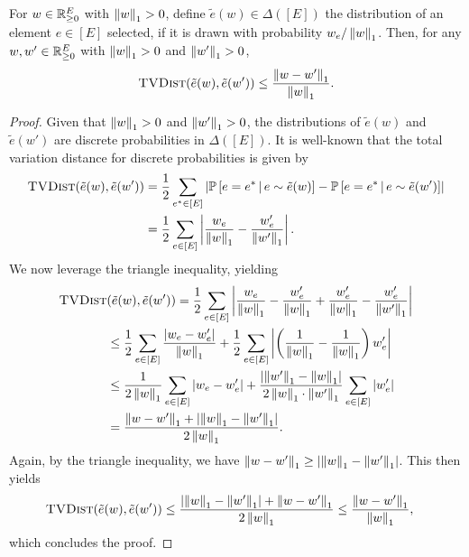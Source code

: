 \begin{lemma}
    \label{lemma:one-sample}
    For $w \in \mathbb R_{\geq 0}^E$ with $\left\lVert{w}\right\rVert_{1} > 0$,
    define $\tilde e(w) \in \Delta([E])$ the distribution of an element $e \in [E]$ selected,
    if it is drawn with probability $w_e / \left\lVert{w}\right\rVert_{1}$.
    Then, for any $w, w' \in \mathbb R_{\geq 0}^E$ with $\left\lVert{w}\right\rVert_{1} > 0$ and $\left\lVert{w'}\right\rVert_{1} > 0$,
    \begin{align}
        \textsc{TVDist}(\tilde e(w), \tilde e(w')) \leq \frac{\left\lVert{w - w'}\right\rVert_{1}}{\left\lVert{w}\right\rVert_{1}}.
    \end{align}
\end{lemma}

\begin{proof}
    Given that $\left\lVert{w}\right\rVert_{1} > 0$ and $\left\lVert{w'}\right\rVert_{1} > 0$,
    the distributions of $\tilde e(w)$ and $\tilde e(w')$ 
    are discrete probabilities in $\Delta([E])$.
    It is well-known that the total variation distance for discrete probabilities is given by
    \begin{align}
        \textsc{TVDist} (\tilde e(w), \tilde e(w'))
        &= \frac{1}{2} \sum_{e^* \in [E]} \left\lvert{
            \mathbb P\left[e = e^* \,\middle|\,e \sim \tilde e(w)\right]
            - \mathbb P\left[e = e^* \,\middle|\,e \sim \tilde e(w')\right]
        }\right\rvert \\
        &= \frac{1}{2} \sum_{e \in [E]} \left\lvert{
            \frac{w_e}{\left\lVert{w}\right\rVert_{1}}
            - \frac{w_e'}{\left\lVert{w'}\right\rVert_{1}}
        }\right\rvert.
    \end{align}
    We now leverage the triangle inequality, yielding
    \begin{align}
        \textsc{TVDist} &(\tilde e(w), \tilde e(w'))
        = \frac{1}{2} \sum_{e \in [E]} \left\lvert{
            \frac{w_e}{\left\lVert{w}\right\rVert_{1}} - \frac{w_e'}{\left\lVert{w}\right\rVert_{1}}
            + \frac{w_e'}{\left\lVert{w}\right\rVert_{1}} - \frac{w_e'}{\left\lVert{w'}\right\rVert_{1}}
        }\right\rvert \\
        &\leq \frac{1}{2} \sum_{e \in [E]} \frac{\left\lvert{w_e - w_e'}\right\rvert}{\left\lVert{w}\right\rVert_{1}}
        + \frac{1}{2} \sum_{e \in [E]} \left\lvert{
            \left( \frac{1}{\left\lVert{w}\right\rVert_{1}} - \frac{1}{\left\lVert{w}\right\rVert_{1}}\right) 
            w_e'
        }\right\rvert \\
        &\leq \frac{1}{2 \left\lVert{w}\right\rVert_{1}} \sum_{e \in [E]} \left\lvert{w_e - w_e'}\right\rvert
        + \frac{\left\lvert{\left\lVert{w'}\right\rVert_{1} - \left\lVert{w}\right\rVert_{1}}\right\rvert}{2 \left\lVert{w}\right\rVert_{1} \cdot \left\lVert{w'}\right\rVert_{1}} 
            \sum_{e \in [E]} \left\lvert{w_e'}\right\rvert \\
        &= \frac{\left\lVert{w - w'}\right\rVert_{1} + \left\lvert{\left\lVert{w}\right\rVert_{1} - \left\lVert{w'}\right\rVert_{1}}\right\rvert}{2 \left\lVert{w}\right\rVert_{1}}.
    \end{align}
    Again, by the triangle inequality, 
    we have $\left\lVert{w - w'}\right\rVert_{1} \geq \left\lvert{\left\lVert{w}\right\rVert_{1} - \left\lVert{w'}\right\rVert_{1}}\right\rvert$.
    This then yields
    \begin{align}
        \textsc{TVDist} &(\tilde e(w), \tilde e(w'))
        \leq \frac{\left\lvert{\left\lVert{w}\right\rVert_{1} - \left\lVert{w'}\right\rVert_{1}}\right\rvert + \left\lVert{w - w'}\right\rVert_{1}}{2 \left\lVert{w}\right\rVert_{1}} 
        \leq \frac{\left\lVert{w - w'}\right\rVert_{1}}{\left\lVert{w}\right\rVert_{1}},
    \end{align}
    which concludes the proof.
\end{proof}


